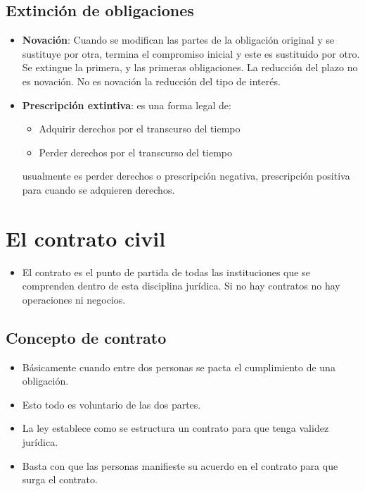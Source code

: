 \documentclass{article}
\begin{document}
\subsection{Extinción de obligaciones}
\begin{itemize}
    \item \textbf{Novación}: Cuando se modifican las partes de la obligación original y se sustituye por otra, termina el compromiso inicial y este es sustituido por otro. Se extingue la primera, y las primeras obligaciones. La reducción del plazo no es novación. No es novación la reducción del tipo de interés.
    \item \textbf{Prescripción extintiva}: es una forma legal de:
        \begin{itemize}
            \item Adquirir derechos por el transcurso del tiempo
            \item Perder derechos por el transcurso del tiempo
        \end{itemize}
        usualmente es perder derechos o prescripción negativa, prescripción positiva para cuando se adquieren derechos. 
\end{itemize}

\section{El contrato civil}
\begin{itemize}
    \item El contrato es el punto de partida de todas las instituciones que se comprenden dentro de esta disciplina jurídica. Si no hay contratos no hay operaciones ni negocios.
\end{itemize}

\subsection{Concepto de contrato}
\begin{itemize}
    \item Básicamente cuando entre dos personas se pacta el cumplimiento de una obligación.
    \item Esto todo es voluntario de las dos partes.
    \item La ley establece como se estructura un contrato para que tenga validez jurídica.
    \item Basta con que las personas manifieste su acuerdo en el contrato para que surga el contrato.
\end{itemize}
\end{document}

